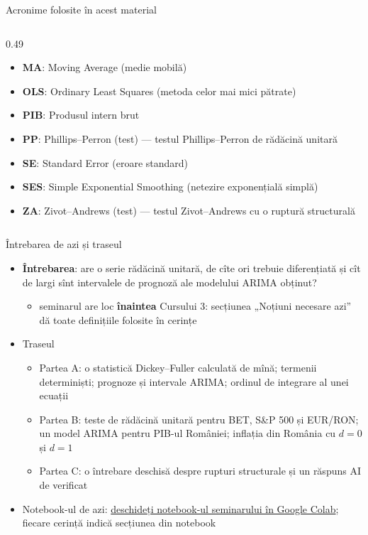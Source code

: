 \begin{frame}{Acronime folosite în acest material}
\begin{columns}[T]
\begin{column}{0.49\textwidth}
\begin{itemize}
    \item \textbf{MA}: Moving Average (medie mobilă)
    \item \textbf{OLS}: Ordinary Least Squares (metoda celor mai mici pătrate)
    \item \textbf{PIB}: Produsul intern brut
    \item \textbf{PP}: Phillips–Perron (test) — testul Phillips–Perron de rădăcină unitară
    \item \textbf{SE}: Standard Error (eroare standard)
    \item \textbf{SES}: Simple Exponential Smoothing (netezire exponențială simplă)
    \item \textbf{ZA}: Zivot–Andrews (test) — testul Zivot–Andrews cu o ruptură structurală
\end{itemize}
\end{column}
\end{columns}
\end{frame}

\begin{frame}{Întrebarea de azi și traseul}
\itemsize{\small}
\begin{itemize}
    \item \textbf{Întrebarea}: are o serie rădăcină unitară, de cîte ori trebuie diferențiată și cît de largi sînt intervalele de prognoză ale modelului ARIMA obținut?
    \begin{itemize}
        \item seminarul are loc \textbf{înaintea} Cursului 3: secțiunea „Noțiuni necesare azi” dă toate definițiile folosite în cerințe
    \end{itemize}
    \item Traseul
    \begin{itemize}
        \item Partea A: o statistică Dickey--Fuller calculată de mînă; termenii determiniști; prognoze și intervale ARIMA; ordinul de integrare al unei ecuații
        \item Partea B: teste de rădăcină unitară pentru BET, S\&P 500 și EUR/RON; un model ARIMA pentru PIB-ul României; inflația din România cu $d = 0$ și $d = 1$
        \item Partea C: o întrebare deschisă despre rupturi structurale și un răspuns AI de verificat
    \end{itemize}
    \item Notebook-ul de azi: \href{\nb}{deschideți notebook-ul seminarului în Google Colab}; fiecare cerință indică secțiunea din notebook
\end{itemize}
\end{frame}

